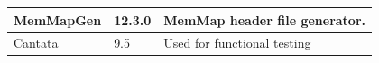 \begin{longtable}{|l|l|l|}
\begin{minipage}{0.18\linewidth}\raggedright\vspace{.75ex}MemMapGen\vspace{.75ex}\end{minipage} & \begin{minipage}{0.18\linewidth}\raggedright\vspace{.75ex}12.3.0\vspace{.75ex}\end{minipage} & \begin{minipage}{0.55\linewidth}\raggedright\vspace{.75ex} MemMap header file generator.\vspace{.75ex}\end{minipage}\\\hline
\begin{minipage}{0.18\linewidth}\raggedright\vspace{.75ex}Cantata\vspace{.75ex}\end{minipage} & \begin{minipage}{0.18\linewidth}\raggedright\vspace{.75ex}9.5\vspace{.75ex}\end{minipage} & \begin{minipage}{0.55\linewidth}\raggedright\vspace{.75ex}Used for functional testing\vspace{.75ex}\end{minipage}\\\hline
\end{longtable}